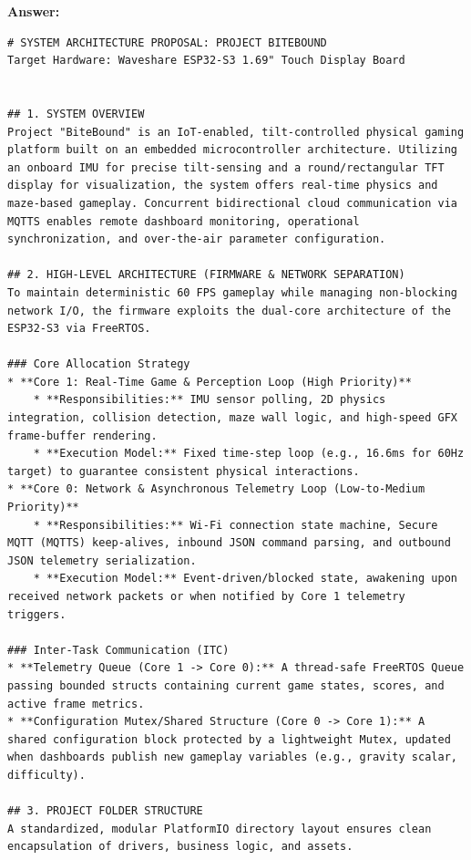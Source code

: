 \textbf{Answer:}
\begin{lstlisting}[language={}, breaklines=true]
# SYSTEM ARCHITECTURE PROPOSAL: PROJECT BITEBOUND
Target Hardware: Waveshare ESP32-S3 1.69" Touch Display Board


## 1. SYSTEM OVERVIEW
Project "BiteBound" is an IoT-enabled, tilt-controlled physical gaming platform built on an embedded microcontroller architecture. Utilizing an onboard IMU for precise tilt-sensing and a round/rectangular TFT display for visualization, the system offers real-time physics and maze-based gameplay. Concurrent bidirectional cloud communication via MQTTS enables remote dashboard monitoring, operational synchronization, and over-the-air parameter configuration.

## 2. HIGH-LEVEL ARCHITECTURE (FIRMWARE & NETWORK SEPARATION)
To maintain deterministic 60 FPS gameplay while managing non-blocking network I/O, the firmware exploits the dual-core architecture of the ESP32-S3 via FreeRTOS.

### Core Allocation Strategy
* **Core 1: Real-Time Game & Perception Loop (High Priority)**
    * **Responsibilities:** IMU sensor polling, 2D physics integration, collision detection, maze wall logic, and high-speed GFX frame-buffer rendering.
    * **Execution Model:** Fixed time-step loop (e.g., 16.6ms for 60Hz target) to guarantee consistent physical interactions.
* **Core 0: Network & Asynchronous Telemetry Loop (Low-to-Medium Priority)**
    * **Responsibilities:** Wi-Fi connection state machine, Secure MQTT (MQTTS) keep-alives, inbound JSON command parsing, and outbound JSON telemetry serialization.
    * **Execution Model:** Event-driven/blocked state, awakening upon received network packets or when notified by Core 1 telemetry triggers.

### Inter-Task Communication (ITC)
* **Telemetry Queue (Core 1 -> Core 0):** A thread-safe FreeRTOS Queue passing bounded structs containing current game states, scores, and active frame metrics.
* **Configuration Mutex/Shared Structure (Core 0 -> Core 1):** A shared configuration block protected by a lightweight Mutex, updated when dashboards publish new gameplay variables (e.g., gravity scalar, difficulty).

## 3. PROJECT FOLDER STRUCTURE
A standardized, modular PlatformIO directory layout ensures clean encapsulation of drivers, business logic, and assets.


\end{lstlisting}
